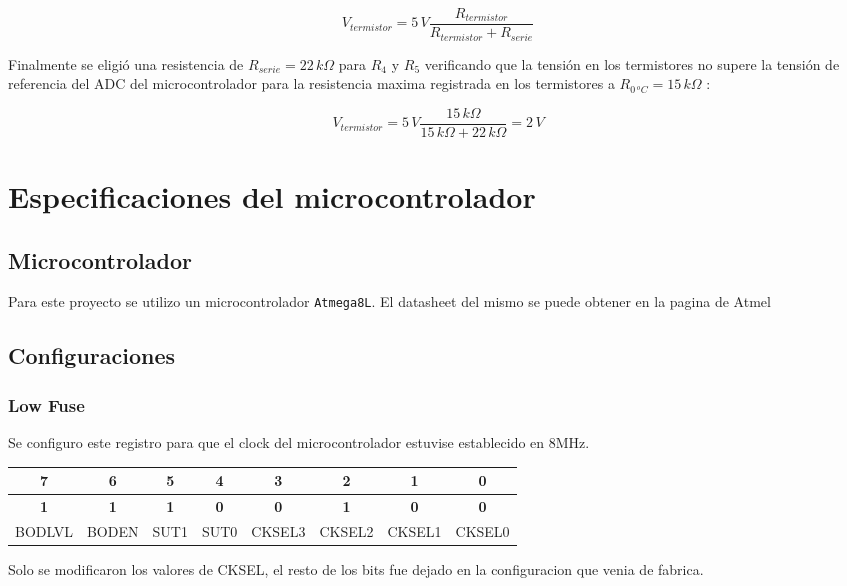 \documentclass[10pt,spanish,a4paper,openany,notitlepage]{article}
\begin{document}
\begin{equation}
V_{termistor} = 5\, \unit{V} \frac{R_{termistor}}{R_{termistor}+R_{serie}}
\label{eq:tension_termistor}
\end{equation}

Finalmente se eligió una resistencia de $R_{serie} = 22\, \unit{k\Omega}$
para $R_4$ y $R_5$ verificando que la tensión en los termistores no supere
la tensión de referencia del ADC del microcontrolador para la resistencia
maxima registrada en los termistores a $R_{0\,\unit{^oC}} = 15\, \unit{k\Omega}$ :

\[ \displaystyle V_{termistor} = 5\, \unit{V} \frac{15\, \unit{k\Omega}}{15\, \unit{k\Omega}+22\, \unit{k\Omega}} = 2\, \unit{V}\]

\section{Especificaciones del microcontrolador}

\subsection{Microcontrolador}
Para este proyecto se utilizo un microcontrolador \texttt{Atmega8L}. El datasheet del mismo se puede obtener en la pagina de Atmel\cite{datasheet}
\subsection{Configuraciones}
\subsubsection{Low Fuse}
Se configuro este registro para que el clock del microcontrolador estuvise establecido en 8MHz. 
\begin{center}
\begin{tabular}{|c|c|c|c|c|c|c|c|}\hline
7&6&5&4&3&2&1&0\\\hline
\textbf{1}&\textbf{1}&\textbf{1}&\textbf{0}&\textbf{0}&\textbf{1}&\textbf{0}&\textbf{0}\\\hline
BODLVL&BODEN&SUT1&SUT0&CKSEL3&CKSEL2&CKSEL1&CKSEL0\\\hline
\end{tabular}
\end{center}
Solo se modificaron los valores de CKSEL, el resto de los bits fue dejado en la configuracion que venia de fabrica.
\end{document}
